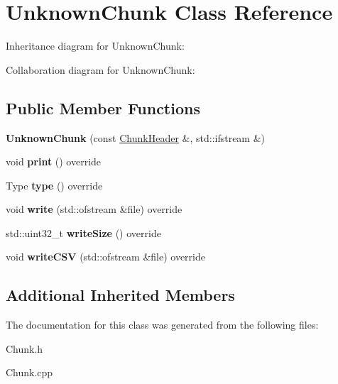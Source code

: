 \hypertarget{classUnknownChunk}{}\section{Unknown\+Chunk Class Reference}
\label{classUnknownChunk}


Inheritance diagram for Unknown\+Chunk\+:


Collaboration diagram for Unknown\+Chunk\+:
\subsection*{Public Member Functions}
\begin{DoxyCompactItemize}
\item 
\mbox{\label{classUnknownChunk_a4a03385f63934cdccaf3f1bede7ef01e}} 
{\bfseries Unknown\+Chunk} (const \hyperlink{structChunkHeader}{Chunk\+Header} \&, std\+::ifstream \&)
\item 
\mbox{\label{classUnknownChunk_afde6cf2566d695adcede67ab79dd9fea}} 
void {\bfseries print} () override
\item 
\mbox{\label{classUnknownChunk_aae8a6edda2ba924aba1327c7f97a4266}} 
Type {\bfseries type} () override
\item 
\mbox{\label{classUnknownChunk_aada320f59f3c1b62bc718cbc6ffe0edb}} 
void {\bfseries write} (std\+::ofstream \&file) override
\item 
\mbox{\label{classUnknownChunk_af8248adf5c2d58f441887b3f0d79bcfd}} 
std\+::uint32\+\_\+t {\bfseries write\+Size} () override
\item 
\mbox{\label{classUnknownChunk_aba397f98ab29121f865a35af63c8a2b4}} 
void {\bfseries write\+C\+SV} (std\+::ofstream \&file) override
\end{DoxyCompactItemize}
\subsection*{Additional Inherited Members}


The documentation for this class was generated from the following files\+:\begin{DoxyCompactItemize}
\item 
Chunk.\+h\item 
Chunk.\+cpp\end{DoxyCompactItemize}

